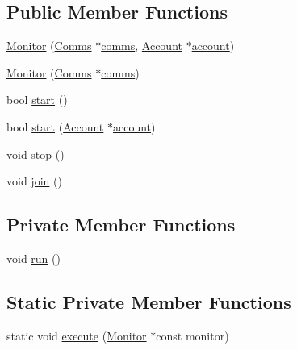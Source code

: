 \subsection*{Public Member Functions}
\begin{DoxyCompactItemize}
\item 
\hyperlink{class_monitor_a092bf291d6c9d140c1edf59875ddf143}{Monitor} (\hyperlink{class_comms}{Comms} $\ast$\hyperlink{class_monitor_a42fffadeba33ae6080b1d95783ca703b}{comms}, \hyperlink{class_account}{Account} $\ast$\hyperlink{class_monitor_acacff99178fbcd9eae50801acc346bf4}{account})
\item 
\hyperlink{class_monitor_aa7e89b9dc22b89f4d12b82eda450c1a0}{Monitor} (\hyperlink{class_comms}{Comms} $\ast$\hyperlink{class_monitor_a42fffadeba33ae6080b1d95783ca703b}{comms})
\item 
bool \hyperlink{class_monitor_a71dfa92dfa25ee137f4e3d5e01a8d673}{start} ()
\item 
bool \hyperlink{class_monitor_a5a01b1c1084f0826a01c184519491cf6}{start} (\hyperlink{class_account}{Account} $\ast$\hyperlink{class_monitor_acacff99178fbcd9eae50801acc346bf4}{account})
\item 
void \hyperlink{class_monitor_a13fb20dc3bd5c8739f5a820cf7433cd8}{stop} ()
\item 
void \hyperlink{class_monitor_a2d2e309666c98333a317c9786f94f6ad}{join} ()
\end{DoxyCompactItemize}
\subsection*{Private Member Functions}
\begin{DoxyCompactItemize}
\item 
void \hyperlink{class_monitor_a81666ecd4a8db05fd3090f7e47eca6ed}{run} ()
\end{DoxyCompactItemize}
\subsection*{Static Private Member Functions}
\begin{DoxyCompactItemize}
\item 
static void \hyperlink{class_monitor_a79e0c78d0973bee48418aedf3aedb2ba}{execute} (\hyperlink{class_monitor}{Monitor} $\ast$const monitor)
\end{DoxyCompactItemize}
